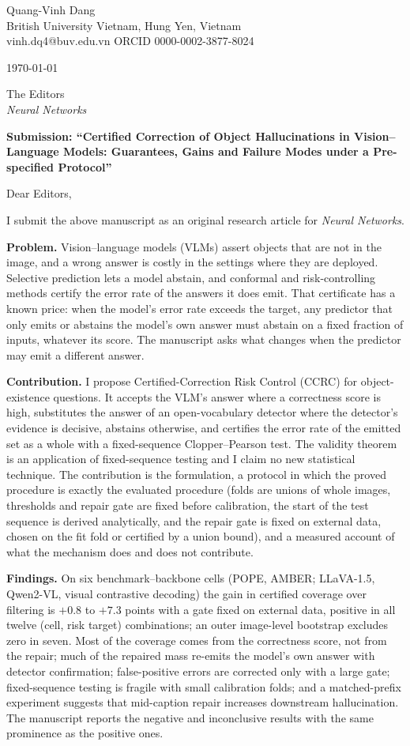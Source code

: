 \documentclass[10.5pt,a4paper]{article}
\begin{document}
Quang-Vinh Dang\\
British University Vietnam, Hung Yen, Vietnam\\
vinh.dq4@buv.edu.vn \quad ORCID 0000-0002-3877-8024

\today

The Editors\\
\emph{Neural Networks}

\textbf{Submission: ``Certified Correction of Object Hallucinations in Vision--Language Models: Guarantees, Gains and Failure Modes under a Pre-specified Protocol''}

Dear Editors,

I submit the above manuscript as an original research article for \emph{Neural Networks}.

\textbf{Problem.} Vision--language models (VLMs) assert objects that are not in the image, and a wrong answer is costly in the settings where they are
deployed. Selective prediction lets a model abstain, and conformal and risk-controlling methods certify the error rate of the answers it does emit.
That certificate has a known price: when the model's error rate exceeds the target, any predictor that only emits or abstains the model's own answer must abstain on a fixed fraction of
inputs, whatever its score. The manuscript asks what changes when the predictor may emit a different answer.

\textbf{Contribution.} I propose Certified-Correction Risk Control (CCRC) for object-existence questions. It accepts the VLM's answer where a correctness score is high,
substitutes the answer of an open-vocabulary detector where the detector's evidence is decisive, abstains otherwise, and certifies the error rate of the emitted
set as a whole with a fixed-sequence Clopper--Pearson test. The validity theorem is an application of fixed-sequence testing and I claim no new statistical technique. The
contribution is the formulation, a protocol in which the proved procedure is exactly the evaluated procedure (folds are unions of whole images, thresholds and repair gate are fixed before calibration, the start of the test sequence is derived analytically, and the repair gate is fixed on external data, chosen on the fit fold or certified by a union bound), and a measured account of what the mechanism does and does not contribute.

\textbf{Findings.} On six benchmark--backbone cells (POPE, AMBER; LLaVA-1.5, Qwen2-VL, visual contrastive decoding) the gain in certified coverage over filtering is
$+0.8$ to $+7.3$ points with a gate fixed on external data, positive in all twelve (cell, risk target) combinations; an outer image-level bootstrap excludes zero in seven. Most
of the coverage comes from the correctness score, not from the repair; much of the repaired mass re-emits the model's own answer with detector confirmation; false-positive errors are corrected only
with a large gate; fixed-sequence testing is fragile with small calibration folds; and a matched-prefix experiment suggests that mid-caption repair increases downstream hallucination.
The manuscript reports the negative and inconclusive results with the same prominence as the positive ones.
\end{document}
